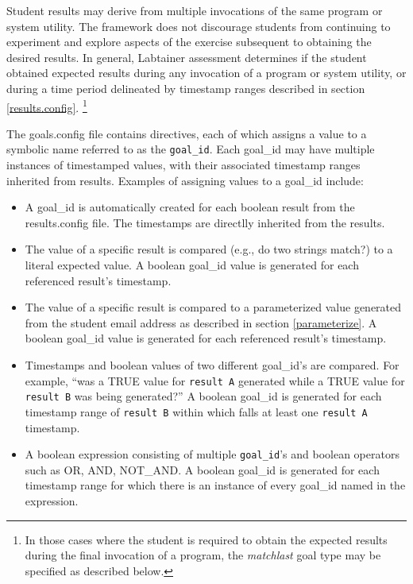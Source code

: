\documentclass[12pt]{article}
\begin{document}
Student results may derive from multiple invocations of the same program or system utility.  
The framework does not discourage students from continuing to experiment and explore aspects of the 
exercise subsequent to obtaining the desired results.  In general, Labtainer assessment determines if the student
obtained expected results during any invocation of a program or system utility, or during a time period
delineated by timestamp ranges described in section \ref{results.config}.  \footnote{In those cases 
where the student is required to obtain the expected results during the final invocation of a program, 
the \textit{matchlast} goal type may be specified as described below.}

The goals.config file contains directives, each of which assigns a value to a symbolic name referred
to as the {\tt goal\_id}.  Each goal\_id may have multiple instances of timestamped values, with their
associated timestamp ranges inherited from results.  Examples of assigning values to a goal\_id include:
\begin{itemize}
\item A goal\_id is automatically created for each boolean result from the results.config file.  The timestamps
are directlly inherited from the results.

\item The value of a specific result is compared (e.g., do two strings match?) to a literal expected value.
A boolean goal\_id value is generated for each referenced result's timestamp.

\item The value of a specific result is compared to a parameterized value
generated from the student email address as described in section \ref{parameterize}.
A boolean goal\_id value is generated for each referenced result's timestamp.

\item Timestamps and boolean values of two different goal\_id's are compared.  For example, ``was
a TRUE value for {\tt result A} generated while a TRUE value for {\tt result B} was being generated?''  
A boolean goal\_id is generated for each
timestamp range of {\tt result B} within which falls at least one {\tt result A} timestamp.

\item A boolean expression consisting of multiple {\tt goal\_id}'s and boolean operators such as OR, AND, NOT\_AND.
A boolean goal\_id is generated for each timestamp range for which there is an instance of every goal\_id named
in the expression.
\end{itemize}
\end{document}
